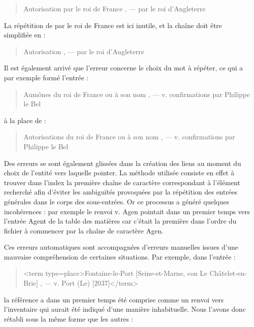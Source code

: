 \documentclass[a4paper,12pt,twoside]{book}
\begin{document}
	\begin{quotation}
		Autorisation par le roi de France , — par le roi d’Angleterre
	\end{quotation}
	
	\noindent La répétition de \og par le roi de France\fg{} est ici inutile, et la chaîne doit être simplifiée en :
	
	\begin{quotation}
		Autorisation , — par le roi d’Angleterre
	\end{quotation}

	\noindent Il est également arrivé que l'erreur concerne le choix du mot à répéter, ce qui a par exemple formé l'entrée :

	\begin{quotation}
		Aumônes du roi de France ou à son nom , — v. confirmations par Philippe le
	Bel
	\end{quotation}
	
	\noindent à la place de :
	
	\begin{quotation}
		Autorisations du roi de France ou à son nom , — v. confirmations par Philippe le	Bel
	\end{quotation}

	Des erreurs se sont également glissées dans la création des liens au moment du choix de l'entité vers laquelle pointer. La méthode utilisée consiste en effet à trouver dans l'index la première chaîne de caractère correspondant à l'élément recherché afin d'éviter les ambiguïtés provoquées par la répétition des entrées générales dans le corps des sous-entrées. Or ce processus a généré quelques incohérences : par exemple le renvoi \og v. Agen\fg{} pointait dans un premier temps vers l'entrée \og Agent\fg{} de la table des matières car c'était la première dans l'ordre du fichier à commencer par la chaîne de caractère \og Agen\fg{}.
	
	Ces erreurs automatiques sont accompagnées d'erreurs manuelles issues d'une mauvaise compréhension de certaines situations. Par exemple, dans l'entrée :
	
	\begin{quotation}
		<term type=\textquotesingle place\textquotesingle >Fontaine-le-Port [Seine-et-Marne, con Le Châtelet-en-Brie] , —
			v. Port (Le) [2037]</term>
	\end{quotation}
	
	\noindent la référence \fg{} a dans un premier temps été comprise comme un renvoi vers l'inventaire qui aurait été indiqué d'une manière inhabituelle. Nous l'avons donc rétabli sous la même forme que les autres :
	
\end{document}
